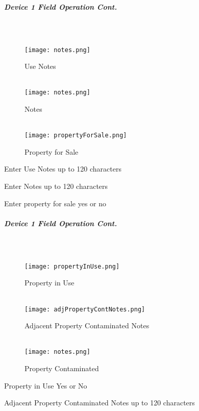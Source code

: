 \documentclass[class=article , crop=false, titlepage, twoside, multi={itemize, figure, verbatim}, float=false]{standalone}
\begin{document}
\clearpage
\subparagraph*{Device 1 Field Operation Cont.}
\subparagraph*{\\}
\begin{wrapfigure}{r}{0.5\textwidth}
\centering
\texttt{[image: notes.png]}
\caption {Use Notes}
\vspace{.2in}
\HRule \\[.4cm] %
\vspace{.2in}
\texttt{[image: notes.png]}
\caption{Notes}
\vspace{.2in}
\HRule \\[.4cm] %
\vspace{.2in}
\texttt{[image: propertyForSale.png]}
\caption{Property for Sale}
\end{wrapfigure}
Enter  Use Notes up to 120 characters\\
\vspace{3in}

\noindent Enter Notes up to 120 characters\\
\vspace{3in}

\noindent Enter property for sale yes or no\\

\clearpage
\subparagraph*{Device 1 Field Operation Cont.}
\subparagraph*{\\}
\begin{wrapfigure}{r}{0.5\textwidth}
\centering
\texttt{[image: propertyInUse.png]}
\caption {Property in Use}
\vspace{.2in}
\HRule \\[.4cm] %
\vspace{.2in}
\texttt{[image: adjPropertyContNotes.png]}
\caption{Adjacent Property Contaminated Notes}
\vspace{.2in}
\HRule \\[.4cm] %
\vspace{.2in}
\texttt{[image: notes.png]}
\caption{Property Contaminated}
\end{wrapfigure}
Property in Use Yes or No\\
\vspace{3in}

\noindent Adjacent Property Contaminated Notes up to 120 characters\\
\vspace{3in}
\end{document}
